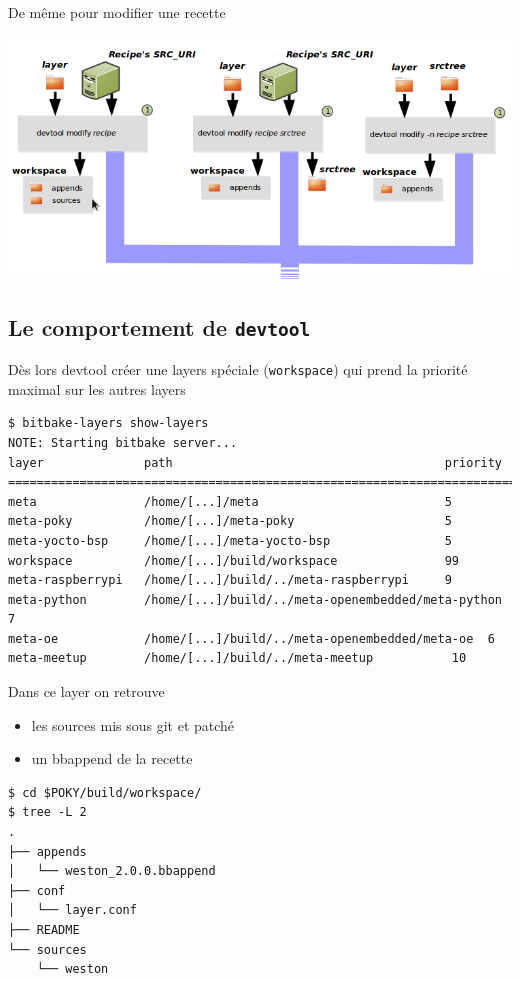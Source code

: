 \documentclass[compress]{smilebeamer}
\begin{document}
\begin{frame}
De même pour modifier une recette
\begin{center}
	\includegraphics[width=1\textwidth]{images/devtool-modify-src.png}
\end{center}
\end{frame}

\subsection{Le comportement de \texttt{devtool}}

\begin{frame}[fragile]
Dès lors devtool créer une layers spéciale (\texttt{workspace}) qui prend la priorité maximal sur les autres layers
\begin{lstlisting}[style=shell,breaklines=false,xleftmargin=-18px,xrightmargin=-18px]
$ bitbake-layers show-layers
NOTE: Starting bitbake server...
layer              path                                      priority
=========================================================================
meta               /home/[...]/meta                          5
meta-poky          /home/[...]/meta-poky                     5
meta-yocto-bsp     /home/[...]/meta-yocto-bsp                5
workspace          /home/[...]/build/workspace               99
meta-raspberrypi   /home/[...]/build/../meta-raspberrypi     9
meta-python        /home/[...]/build/../meta-openembedded/meta-python  7
meta-oe            /home/[...]/build/../meta-openembedded/meta-oe  6
meta-meetup        /home/[...]/build/../meta-meetup           10
\end{lstlisting}
\end{frame}

\begin{frame}[fragile]
Dans ce layer on retrouve
\begin{itemize}
	\item les sources mis sous git et patché
	\item un bbappend de la recette
\end{itemize}
\begin{lstlisting}[style=shell]
$ cd $POKY/build/workspace/
$ tree -L 2 
.
├── appends
│   └── weston_2.0.0.bbappend
├── conf
│   └── layer.conf
├── README
└── sources
    └── weston
\end{lstlisting}
\end{frame}
\end{document}
